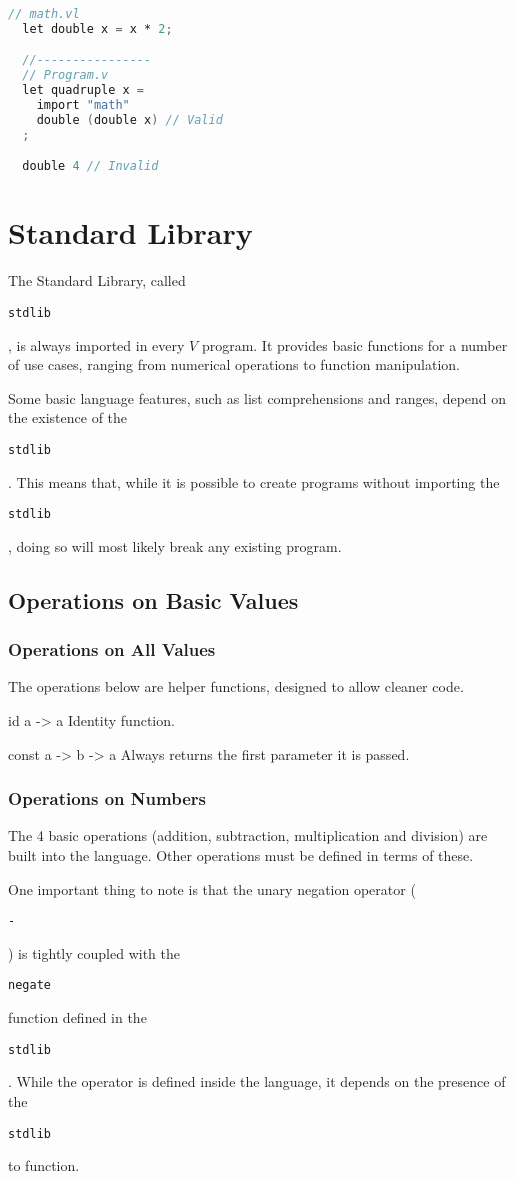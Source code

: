 \documentclass{article}
\def\code#1{\begin{footnotesize}\texttt{#1}\end{footnotesize}}
\begin{document}
\begin{lstlisting}[language=V]
  // math.vl
  let double x = x * 2;

  //----------------
  // Program.v
  let quadruple x =
    import "math"
    double (double x) // Valid
  ;

  double 4 // Invalid
\end{lstlisting}

\newpage

\section{Standard Library}\label{Standard Library}

The Standard Library, called \code{stdlib}, is always imported in every $V$ program.
It provides basic functions for a number of use cases, ranging from numerical operations to function manipulation.

Some basic language features, such as list comprehensions and ranges, depend on the existence of the \code{stdlib}.
This means that, while it is possible to create programs without importing the \code{stdlib}, doing so will most likely break any existing program.

\subsection{Operations on Basic Values}

\subsubsection{Operations on All Values}

The operations below are helper functions, designed to allow cleaner code.

\medskip

\libfunction
  {id}
  {a -> a}
  {Identity function.}

\libfunction
  {const}
  {a -> b -> a}
  {Always returns the first parameter it is passed.}

\subsubsection{Operations on Numbers}

The 4 basic operations (addition, subtraction, multiplication and division) are built into the language.
Other operations must be defined in terms of these.

One important thing to note is that the unary negation operator (\code{-}) is tightly coupled with the \code{negate} function defined in the \code{stdlib}.
While the operator is defined inside the language, it depends on the presence of the \code{stdlib} to function.
\end{document}
